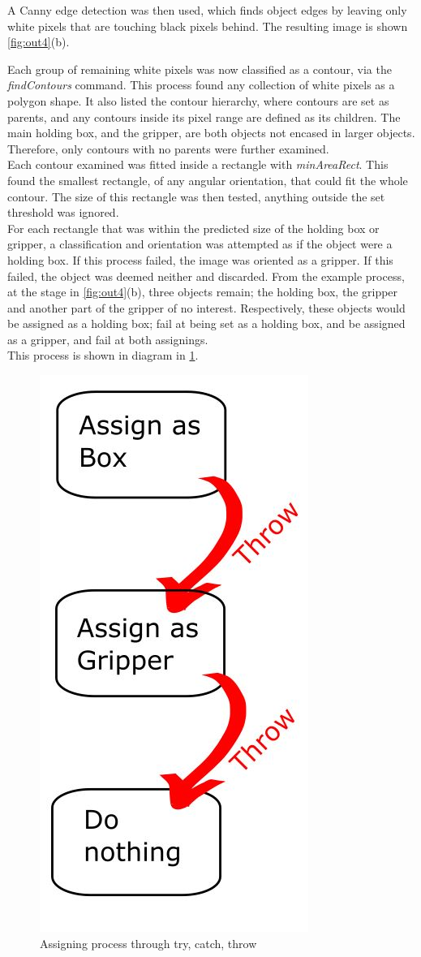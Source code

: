 \documentclass[11pt,a4paper]{report}
\begin{document}
A Canny edge detection was then used, which finds object edges by leaving only white pixels that are touching black pixels behind. The resulting image is shown \cref{fig:out4}(b).

Each group of remaining white pixels was now classified as a contour, via the \textit{findContours} command. This process found any collection of white pixels as a polygon shape. It also listed the contour hierarchy, where contours are set as parents, and any contours inside its pixel range are defined as its children. The main holding box, and the gripper, are both objects not encased in larger objects. Therefore, only contours with no parents were further examined.\\

Each contour examined was fitted inside a rectangle with \textit{minAreaRect}. This found the smallest rectangle, of any angular orientation, that could fit the whole contour. The size of this rectangle was then tested, anything outside the set threshold was ignored.\\
For each rectangle that was within the predicted size of the holding box or gripper, a classification and orientation was attempted as if the object were a holding box. If this process failed, the image was oriented as a gripper. If this failed, the object was deemed neither and discarded. From the example process, at the stage in \cref{fig:out4}(b), three objects remain; the holding box, the gripper and another part of the gripper of no interest.  Respectively, these objects would be assigned as a holding box; fail at being set as a holding box, and be assigned as a gripper, and fail at both assignings.\\
This process is shown in diagram in \cref{fig:Throwlinek}.
\begin{figure}[h]
\centering
\includegraphics[width=0.2\linewidth]{Throwlinek}
\caption{Assigning process through try, catch, throw}
\label{fig:Throwlinek}
\end{figure}
\end{document}
